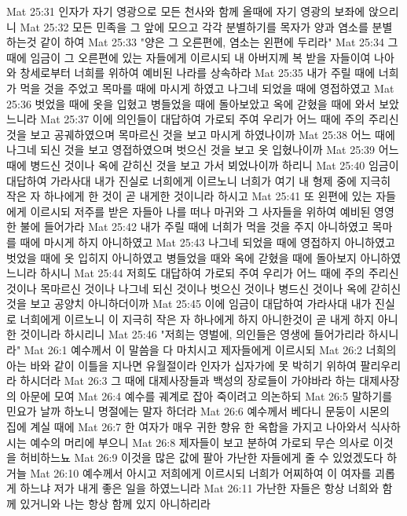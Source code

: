 Mat 25:31  인자가 자기 영광으로 모든 천사와 함께 올때에 자기 영광의 보좌에 앉으리니
Mat 25:32  모든 민족을 그 앞에 모으고 각각 분별하기를 목자가 양과 염소를 분별하는것 같이 하여
Mat 25:33  "양은 그 오른편에, 염소는 왼편에 두리라"
Mat 25:34  그 때에 임금이 그 오른편에 있는 자들에게 이르시되 내 아버지께 복 받을 자들이여 나아와 창세로부터 너희를 위하여 예비된 나라를 상속하라
Mat 25:35  내가 주릴 때에 너희가 먹을 것을 주었고 목마를 때에 마시게 하였고 나그네 되었을 때에 영접하였고
Mat 25:36  벗었을 때에 옷을 입혔고 병들었을 때에 돌아보았고 옥에 갇혔을 때에 와서 보았느니라
Mat 25:37  이에 의인들이 대답하여 가로되 주여 우리가 어느 때에 주의 주리신 것을 보고 공궤하였으며 목마르신 것을 보고 마시게 하였나이까
Mat 25:38  어느 때에 나그네 되신 것을 보고 영접하였으며 벗으신 것을 보고 옷 입혔나이까
Mat 25:39  어느 때에 병드신 것이나 옥에 갇히신 것을 보고 가서 뵈었나이까 하리니
Mat 25:40  임금이 대답하여 가라사대 내가 진실로 너희에게 이르노니 너희가 여기 내 형제 중에 지극히 작은 자 하나에게 한 것이 곧 내게한 것이니라 하시고
Mat 25:41  또 왼편에 있는 자들에게 이르시되 저주를 받은 자들아 나를 떠나 마귀와 그 사자들을 위하여 예비된 영영한 불에 들어가라
Mat 25:42  내가 주릴 때에 너희가 먹을 것을 주지 아니하였고 목마를 때에 마시게 하지 아니하였고
Mat 25:43  나그네 되었을 때에 영접하지 아니하였고 벗었을 때에 옷 입히지 아니하였고 병들었을 때와 옥에 갇혔을 때에 돌아보지 아니하였느니라 하시니
Mat 25:44  저희도 대답하여 가로되 주여 우리가 어느 때에 주의 주리신 것이나 목마르신 것이나 나그네 되신 것이나 벗으신 것이나 병드신 것이나 옥에 갇히신 것을 보고 공양치 아니하더이까
Mat 25:45  이에 임금이 대답하여 가라사대 내가 진실로 너희에게 이르노니 이 지극히 작은 자 하나에게 하지 아니한것이 곧 내게 하지 아니한 것이니라 하시리니
Mat 25:46  "저희는 영벌에, 의인들은 영생에 들어가리라 하시니라"
Mat 26:1  예수께서 이 말씀을 다 마치시고 제자들에게 이르시되
Mat 26:2  너희의 아는 바와 같이 이틀을 지나면 유월절이라 인자가 십자가에 못 박히기 위하여 팔리우리라 하시더라
Mat 26:3  그 때에 대제사장들과 백성의 장로들이 가야바라 하는 대제사장의 아문에 모여
Mat 26:4  예수를 궤계로 잡아 죽이려고 의논하되
Mat 26:5  말하기를 민요가 날까 하노니 명절에는 말자 하더라
Mat 26:6  예수께서 베다니 문둥이 시몬의 집에 계실 때에
Mat 26:7  한 여자가 매우 귀한 향유 한 옥합을 가지고 나아와서 식사하시는 예수의 머리에 부으니
Mat 26:8  제자들이 보고 분하여 가로되 무슨 의사로 이것을 허비하느뇨
Mat 26:9  이것을 많은 값에 팔아 가난한 자들에게 줄 수 있었겠도다 하거늘
Mat 26:10  예수께서 아시고 저희에게 이르시되 너희가 어찌하여 이 여자를 괴롭게 하느냐 저가 내게 좋은 일을 하였느니라
Mat 26:11  가난한 자들은 항상 너희와 함께 있거니와 나는 항상 함께 있지 아니하리라
